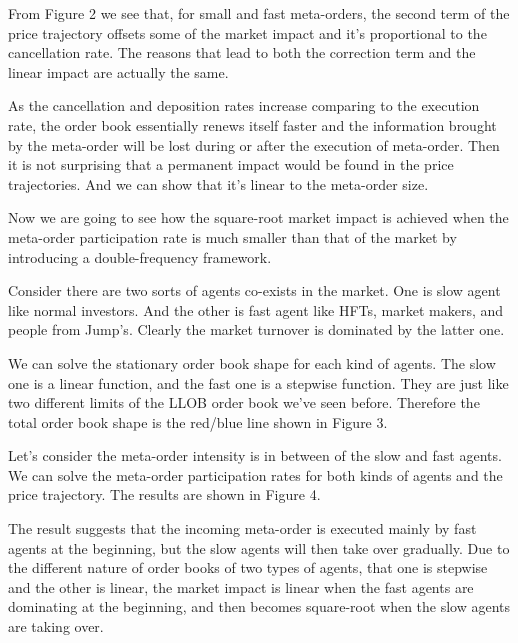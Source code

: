 \documentclass{article}
\begin{document}
From Figure 2 we see that, for small and fast meta-orders, the second term of the price trajectory offsets some of the market impact and it's proportional to the cancellation rate. The reasons that lead to both the correction term and the linear impact are actually the same. \newline

As the cancellation and deposition rates increase comparing to the execution rate, the order book essentially renews itself faster and the information brought by the meta-order will be lost during or after the execution of meta-order. Then it is not surprising that a permanent impact would be found in the price trajectories. And we can show that it's linear to the meta-order size. \newline

Now we are going to see how the square-root market impact is achieved when the meta-order participation rate is much smaller than that of the market by introducing a double-frequency framework. \newline

Consider there are two sorts of agents co-exists in the market. One is slow agent like normal investors. And the other is fast agent like HFTs, market makers, and people from Jump's. Clearly the market turnover is dominated by the latter one. \newline

We can solve the stationary order book shape for each kind of agents. The slow one is a linear function, and the fast one is a stepwise function. They are just like two different limits of the LLOB order book we've seen before. Therefore the total order book shape is the red/blue line shown in Figure 3. \newline

Let's consider the meta-order intensity is in between of the slow and fast agents. We can solve the meta-order participation rates for both kinds of agents and the price trajectory. The results are shown in Figure 4. \newline

The result suggests that the incoming meta-order is executed mainly by fast agents at the beginning, but the slow agents will then take over gradually. Due to the different nature of order books of two types of agents, that one is stepwise and the other is linear, the market impact is linear when the fast agents are dominating at the beginning, and then becomes square-root when the slow agents are taking over. \newline
\end{document}
